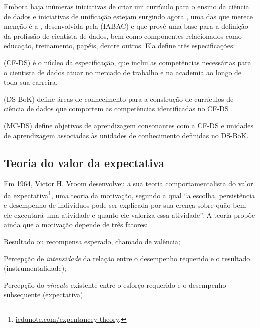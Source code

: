 Embora haja inúmeras iniciativas  de criar um currículo para o ensino da ciência de dados \cite{Hassan2019, Anderson2014, Cheng2019} e iniciativas de unificação estejam surgindo agora \cite{Raj2019}, uma das que merece menção é a , desenvolvida pela  (IABAC) e que provê uma base para a definição da profissão de cientista de dados, bem como componentes relacionados como educação, treinamento, papéis, dentre outros.
Ela define três especificações:
\begin{compactitem}
	\item {} (CF-DS) é o núcleo da especificação, que inclui as competências necessárias para o cientista de dados atuar no mercado de trabalho e na academia ao longo de toda sua carreira.
	\item {} (DS-BoK) define áreas de conhecimento para a construção de currículos de ciência de dados que comportem as competências identificadas no CF-DS \cite{Demchenko2017}.
	\item {} (MC-DS) define objetivos de aprendizagem consonantes com a CF-DS e unidades de aprendizagem associadas às unidades de conhecimento definidas no DS-BoK.
\end{compactitem}

\subsection{Teoria do valor da expectativa}

Em 1964, Victor H. Vroom desenvolveu a sua teoria comportamentalista do valor da expectativa\footnote{\url{iedunote.com/expentancey-theory}.}, uma teoria da motivação, segundo a qual ``a escolha, persistência e desempenho de indivíduos pode ser explicada por sua crença sobre quão bem ele executará uma atividade e quanto ele valoriza essa atividade''.
A teoria propõe ainda que a motivação depende de três fatores: 
\begin{compactitem}
	\item Resultado ou recompensa esperado, chamado de valência;
	\item Percepção de \emph{intensidade} da relação entre o desempenho requerido e o resultado (instrumentalidade);
	\item Percepção do \emph{vínculo} existente entre o esforço requerido e o desempenho subsequente (expectativa).
\end{compactitem}

